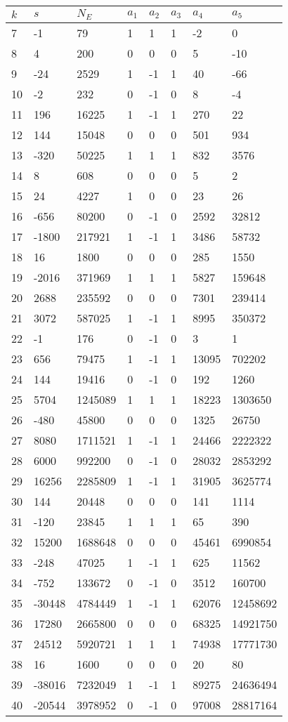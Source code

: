 \documentclass{amsart}
\begin{document}
\begin{longtable}{|l|l|l|lllll|}
\hline
$k$ & $s$ & $N_E$ & $a_1$ & $a_2$ & $a_3$ & $a_4$ & $a_5$\\
\hline
7&-1&79&1&1&1&-2&0\\
8&4&200&0&0&0&5&-10\\
9&-24&2529&1&-1&1&40&-66\\
10&-2&232&0&-1&0&8&-4\\
11&196&16225&1&-1&1&270&22\\
12&144&15048&0&0&0&501&934\\
13&-320&50225&1&1&1&832&3576\\
14&8&608&0&0&0&5&2\\
15&24&4227&1&0&0&23&26\\
16&-656&80200&0&-1&0&2592&32812\\
17&-1800&217921&1&-1&1&3486&58732\\
18&16&1800&0&0&0&285&1550\\
19&-2016&371969&1&1&1&5827&159648\\
20&2688&235592&0&0&0&7301&239414\\
21&3072&587025&1&-1&1&8995&350372\\
22&-1&176&0&-1&0&3&1\\
23&656&79475&1&-1&1&13095&702202\\
24&144&19416&0&-1&0&192&1260\\
25&5704&1245089&1&1&1&18223&1303650\\
26&-480&45800&0&0&0&1325&26750\\
27&8080&1711521&1&-1&1&24466&2222322\\
28&6000&992200&0&-1&0&28032&2853292\\
29&16256&2285809&1&-1&1&31905&3625774\\
30&144&20448&0&0&0&141&1114\\
31&-120&23845&1&1&1&65&390\\
32&15200&1688648&0&0&0&45461&6990854\\
33&-248&47025&1&-1&1&625&11562\\
34&-752&133672&0&-1&0&3512&160700\\
35&-30448&4784449&1&-1&1&62076&12458692\\
36&17280&2665800&0&0&0&68325&14921750\\
37&24512&5920721&1&1&1&74938&17771730\\
38&16&1600&0&0&0&20&80\\
39&-38016&7232049&1&-1&1&89275&24636494\\
40&-20544&3978952&0&-1&0&97008&28817164\\

\end{longtable}
\end{document}
